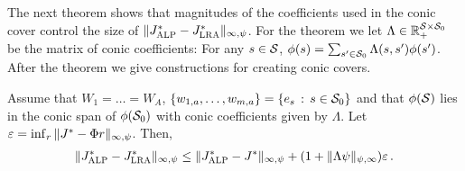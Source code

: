 \documentclass[twocolumn]{IEEEtran}
\begin{document}
The next theorem shows that magnitudes of the coefficients used in the conic cover control the size of 
$\norm{\Jalpo-\Jlro}_{\infty,\psi}$. 
For the theorem we let $\Lambda\in \Re_+^{\S\times \S_0}$ be the matrix of conic coefficients: 
For any $s\in \S$, $\phi(s) = \sum_{s'\in \S_0} \Lambda(s,s') \phi(s')$. After the theorem we give constructions 
for creating conic covers.
\begin{theorem}
\label{conetheorm}
Assume that $W_1 = \dots = W_A$, $\{w_{1,a},\dots,w_{m,a}\} = \{ e_s\,:\, s\in \S_0 \}$ 
and that $\phi(\S)$ lies in the conic span of $\phi(\S_0)$ with conic coefficients given by $\Lambda$.
Let $\epsilon = \inf_{r}\norm{ J^* -  \Phi r }_{\infty,\psi}$.
Then, 
\begin{align*}
\norm{\Jalpo-\Jlro}_{\infty,\psi}
\le 
\norm{\Jalpo-J^*}_{\infty,\psi} + (1+ \norm{\Lambda \psi}_{\psi,\infty}) \epsilon\,.
\end{align*}
\end{theorem}
\end{document}
